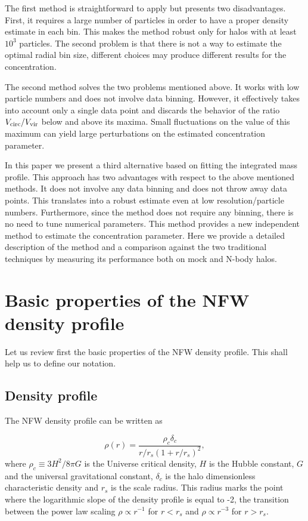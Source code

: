 \documentclass{emulateapj}
\begin{document}
The first method is straightforward to apply but presents two
disadvantages.  First, it requires a large number of particles in
order to have a proper density estimate in each bin.  This makes the
method robust only for halos with at least $10^3$ particles.  The
second problem is that there is not a way to estimate the optimal
radial bin size, different choices may produce different results for
the concentration.

The second method solves the two problems mentioned above.  It works
with low particle numbers and does not involve data binning.  However,
it effectively takes into account only a single data point and
discards the behavior of the ratio $V_{\rm circ}/V_{\rm vir}$ below
and above its maxima.  Small fluctuations on the value of this maximum
can yield large perturbations on the estimated concentration
parameter.

In this paper we present a third alternative based on fitting the
integrated mass profile.  This approach has two advantages with
respect to the above mentioned methods.  It does not involve any data
binning and does not throw away data points.  This translates into a
robust estimate even at low resolution/particle numbers.  Furthermore,
since the method does not require any binning, there is no need to
tune numerical parameters.  This method provides a new independent
method to estimate the concentration parameter.  Here we provide a
detailed description of the method and a comparison against the two
traditional techniques by measuring its performance both on mock and
N-body halos.


\section{Basic properties of the NFW density profile}
\label{sec:basics}

Let us review first the basic properties of the NFW density profile.
This shall help us to define our notation.

\subsection{Density profile}

The NFW density profile can be written as

\begin{equation}
\rho(r) = \frac{\rho_c\delta_c}{r/r_s(1+r/r_s)^2},
\label{eq:definition}
\end{equation}
%
where $\rho_c\equiv 3H^2/8\pi G$ is the Universe critical density, $H$
is the Hubble constant, $G$ and the universal gravitational constant,
$\delta_c$ is the halo dimensionless characteristic density and $r_s$
is the scale radius.  This radius marks the point where the
logarithmic slope of the density profile is equal to -2, the
transition between the power law scaling $\rho\propto r^{-1}$ for
$r<r_s$ and $\rho\propto r^{-3}$ for $r>r_s$.
\end{document}
